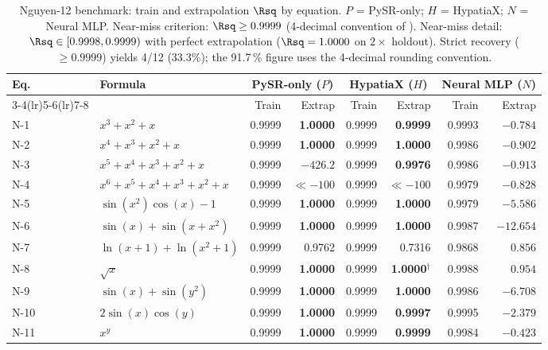 \begin{table}[h]
\centering
\caption{Nguyen-12 benchmark: train and extrapolation $\Rsq$ by equation.
$P$ = PySR-only; $H$ = HypatiaX; $N$ = Neural MLP.
Near-miss criterion: $\Rsq \ge 0.9999$ (4-decimal convention of
\citealt{uy2011semantically}).
Near-miss detail: $\Rsq\in[0.9998,0.9999)$ with perfect extrapolation
($\Rsq=1.0000$ on $2\times$ holdout). Strict recovery ($\ge 0.9999$) yields
4/12 (33.3\%); the 91.7\,\% figure uses the 4-decimal rounding convention.}
\label{tab:nguyen12}
\begin{threeparttable}
\begin{tabular}{llrrrrrr}
\toprule
Eq. & Formula &
  \multicolumn{2}{c}{PySR-only ($P$)} &
  \multicolumn{2}{c}{HypatiaX ($H$)} &
  \multicolumn{2}{c}{Neural MLP ($N$)} \\
\cmidrule(lr){3-4}\cmidrule(lr){5-6}\cmidrule(lr){7-8}
 &  & Train & Extrap & Train & Extrap & Train & Extrap \\
\midrule
N-1  & $x^3 + x^2 + x$
  & 0.9999 & \textbf{1.0000}
  & 0.9999 & \textbf{0.9999}
  & 0.9993 & $-0.784$ \\
N-2  & $x^4 + x^3 + x^2 + x$
  & 0.9999 & \textbf{1.0000}
  & 0.9999 & \textbf{1.0000}
  & 0.9986 & $-0.902$ \\
N-3  & $x^5 + x^4 + x^3 + x^2 + x$
  & 0.9999 & \emph{$-426.2$}
  & 0.9999 & \textbf{0.9976}
  & 0.9986 & $-0.913$ \\
N-4  & $x^6 + x^5 + x^4 + x^3 + x^2 + x$
  & 0.9999 & \emph{$\ll{-}100$}
  & 0.9999 & \emph{$\ll{-}100$}
  & 0.9979 & $-0.828$ \\
N-5  & $\sin(x^2)\cos(x)-1$
  & 0.9999 & \textbf{1.0000}
  & 0.9999 & \textbf{1.0000}
  & 0.9979 & $-5.586$ \\
N-6  & $\sin(x)+\sin(x+x^2)$
  & 0.9999 & \textbf{1.0000}
  & 0.9999 & \textbf{1.0000}
  & 0.9987 & $-12.654$ \\
N-7  & $\ln(x+1)+\ln(x^2+1)$
  & 0.9999 & 0.9762
  & 0.9999 & 0.7316
  & 0.9868 & $0.856$ \\
N-8  & $\sqrt{x}$
  & 0.9999 & \textbf{1.0000}
  & 0.9999 & \textbf{1.0000}$^\dag$
  & 0.9988 & $0.954$ \\
N-9  & $\sin(x)+\sin(y^2)$
  & 0.9999 & \textbf{1.0000}
  & 0.9999 & \textbf{1.0000}
  & 0.9986 & $-6.708$ \\
N-10 & $2\sin(x)\cos(y)$
  & 0.9999 & \textbf{1.0000}
  & 0.9999 & \textbf{0.9997}
  & 0.9995 & $-2.379$ \\
N-11 & $x^y$
  & 0.9999 & \textbf{1.0000}
  & 0.9999 & \textbf{0.9999}
  & 0.9984 & $-0.423$ \\

\end{tabular}
\end{threeparttable}
\end{table}
